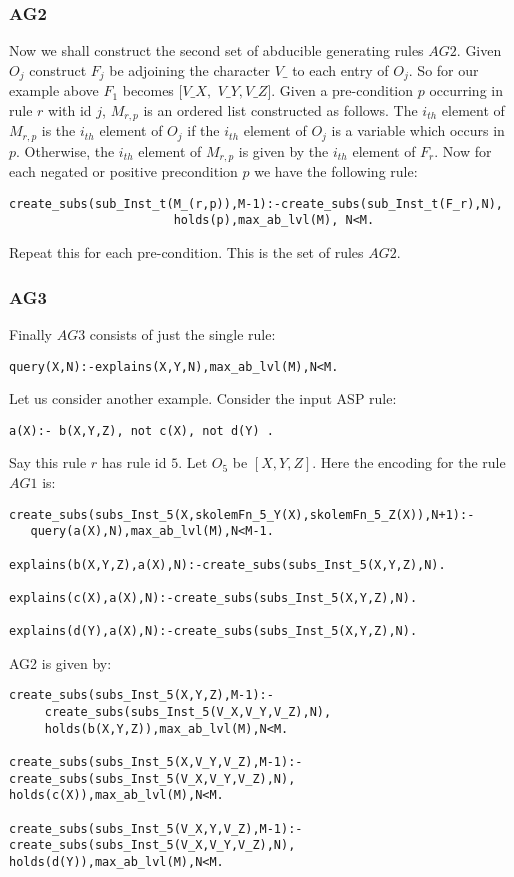\subsubsection{AG2}
Now we shall construct the second set
of abducible generating rules $AG2$. Given $O_{j}$ construct $F_{j}$ be adjoining the character
$V\_$ to each entry of $O_{j}$. So for our example above $F_{1}$ becomes
$[V\_X,$ $V\_Y,V\_Z]$. Given a pre-condition $p$
occurring in rule $r$ with id $j$, $M_{r,p}$ is an ordered list constructed as follows. The
$i_{th}$ element of $M_{r,p}$ is the $i_{th}$ element of $O_{j}$ if the
$i_{th}$ element of $O_{j}$ is a variable which occurs in $p$. Otherwise, the
$i_{th}$ element of $M_{r,p}$ is given by the $i_{th}$ element of $F_{r}$. Now
for each negated or positive precondition $p$ we have the following rule:
\begin{lstlisting}[frame=none]
 create_subs(sub_Inst_t(M_(r,p)),M-1):-create_subs(sub_Inst_t(F_r),N),
                       holds(p),max_ab_lvl(M), N<M.   
\end{lstlisting}
Repeat this for each pre-condition. This is the set of rules $AG2$.


\subsubsection{AG3}
Finally $AG3$ consists of just the single rule:
\begin{lstlisting}[frame=none]
query(X,N):-explains(X,Y,N),max_ab_lvl(M),N<M.
\end{lstlisting}
Let us consider another example.
Consider the input ASP rule:
\begin{verbatim}
a(X):- b(X,Y,Z), not c(X), not d(Y) .    
\end{verbatim}
Say this rule $r$ has rule id $5$. 
Let $O_{5}$ be $[X,Y,Z]$. Here the encoding for the rule $AG1$ is:
\begin{lstlisting}[frame=none]
create_subs(subs_Inst_5(X,skolemFn_5_Y(X),skolemFn_5_Z(X)),N+1):-
   query(a(X),N),max_ab_lvl(M),N<M-1.

explains(b(X,Y,Z),a(X),N):-create_subs(subs_Inst_5(X,Y,Z),N).

explains(c(X),a(X),N):-create_subs(subs_Inst_5(X,Y,Z),N).

explains(d(Y),a(X),N):-create_subs(subs_Inst_5(X,Y,Z),N).
\end{lstlisting}
AG2 is given by:

\begin{lstlisting}[frame=none]
create_subs(subs_Inst_5(X,Y,Z),M-1):-
     create_subs(subs_Inst_5(V_X,V_Y,V_Z),N), 
     holds(b(X,Y,Z)),max_ab_lvl(M),N<M.

create_subs(subs_Inst_5(X,V_Y,V_Z),M-1):-
create_subs(subs_Inst_5(V_X,V_Y,V_Z),N), holds(c(X)),max_ab_lvl(M),N<M.

create_subs(subs_Inst_5(V_X,Y,V_Z),M-1):-
create_subs(subs_Inst_5(V_X,V_Y,V_Z),N), holds(d(Y)),max_ab_lvl(M),N<M.
\end{lstlisting}

